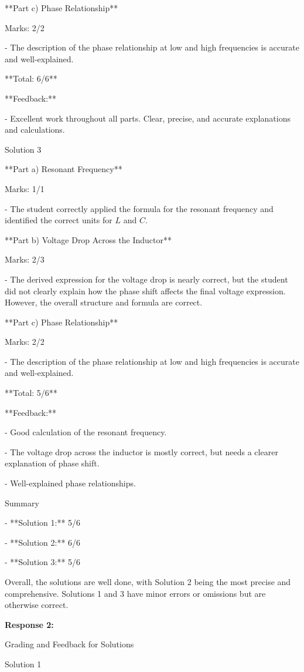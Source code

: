 \documentclass[a4paper,11pt]{article}
\begin{document}
**Part c) Phase Relationship**

Marks: 2/2  

- The description of the phase relationship at low and high frequencies is accurate and well-explained.

**Total: 6/6**

**Feedback:** 

- Excellent work throughout all parts. Clear, precise, and accurate explanations and calculations.

Solution 3

**Part a) Resonant Frequency**

Marks: 1/1  

- The student correctly applied the formula for the resonant frequency and identified the correct units for \( L \) and \( C \).

**Part b) Voltage Drop Across the Inductor**

Marks: 2/3  

- The derived expression for the voltage drop is nearly correct, but the student did not clearly explain how the phase shift affects the final voltage expression. However, the overall structure and formula are correct.

**Part c) Phase Relationship**

Marks: 2/2  

- The description of the phase relationship at low and high frequencies is accurate and well-explained.

**Total: 5/6**

**Feedback:** 

- Good calculation of the resonant frequency. 

- The voltage drop across the inductor is mostly correct, but needs a clearer explanation of phase shift. 

- Well-explained phase relationships.

Summary

- **Solution 1:** 5/6

- **Solution 2:** 6/6

- **Solution 3:** 5/6

Overall, the solutions are well done, with Solution 2 being the most precise and comprehensive. Solutions 1 and 3 have minor errors or omissions but are otherwise correct.

\bigskip
\textbf{Response 2:}

Grading and Feedback for Solutions

Solution 1
\end{document}
